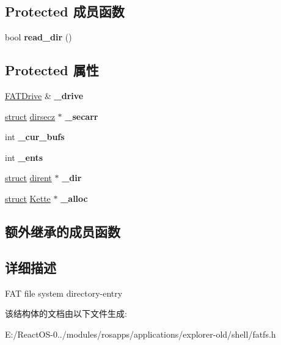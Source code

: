 \subsection*{Protected 成员函数}
\begin{DoxyCompactItemize}
\item 
\mbox{\label{struct_f_a_t_directory_aae41809abc0d39c8ce08d122bef1551b}} 
bool {\bfseries read\+\_\+dir} ()
\end{DoxyCompactItemize}
\subsection*{Protected 属性}
\begin{DoxyCompactItemize}
\item 
\mbox{\label{struct_f_a_t_directory_a0a4e41f9ebbdeb9f7947da065368484d}} 
\hyperlink{struct_f_a_t_drive}{F\+A\+T\+Drive} \& {\bfseries \+\_\+drive}
\item 
\mbox{\label{struct_f_a_t_directory_a14dff2bb65747df66dd7cd989782cbe2}} 
\hyperlink{interfacestruct}{struct} \hyperlink{structdirsecz}{dirsecz} $\ast$ {\bfseries \+\_\+secarr}
\item 
\mbox{\label{struct_f_a_t_directory_a8d8f02e798a912e455f31661162f3915}} 
int {\bfseries \+\_\+cur\+\_\+bufs}
\item 
\mbox{\label{struct_f_a_t_directory_a394e7f142dae3fff3d51035a65a995af}} 
int {\bfseries \+\_\+ents}
\item 
\mbox{\label{struct_f_a_t_directory_a56db7b27b682653a29e0dd27439d947e}} 
\hyperlink{interfacestruct}{struct} \hyperlink{structdirent}{dirent} $\ast$ {\bfseries \+\_\+dir}
\item 
\mbox{\label{struct_f_a_t_directory_a08ca251296023a99b29932d9d6d208ee}} 
\hyperlink{interfacestruct}{struct} \hyperlink{struct_kette}{Kette} $\ast$ {\bfseries \+\_\+alloc}
\end{DoxyCompactItemize}
\subsection*{额外继承的成员函数}


\subsection{详细描述}
F\+AT file system directory-\/entry 

该结构体的文档由以下文件生成\+:\begin{DoxyCompactItemize}
\item 
E\+:/\+React\+O\+S-\/0../modules/rosapps/applications/explorer-\/old/shell/fatfs.\+h\end{DoxyCompactItemize}
